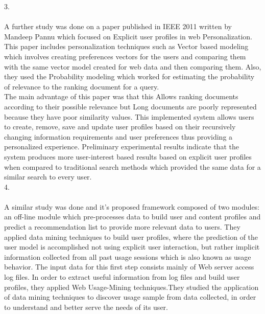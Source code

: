 3.\\ \\ A further study was done on a paper published in IEEE 2011
written by Mandeep Pannu which focused on Explicit user
profiles in web Personalization. This paper includes
personalization techniques such as Vector based modeling
which involves creating preferences vectors for the users and
comparing them with the same vector model created for web
data and then comparing them. Also, they used the Probability
modeling which worked for estimating the probability of
relevance to the ranking document for a query.\\ The main
advantage of this paper was that this Allows ranking
documents according to their possible relevance but Long
documents are poorly represented because they have poor
similarity values. This implemented system allows users to
create, remove, save and update user profiles based on their
recursively changing information requirements and user preferences thus providing a
personalized experience. Preliminary experimental results
indicate that the system produces more user-interest based
results based on explicit user profiles when compared to
traditional search methods which provided the same data for a
similar search to every user.\\

4.\\ \\ A similar study was done and it’s proposed framework
composed of two modules: an off-line module which
pre-processes data to build user and content profiles and predict a recommendation list to
provide more relevant data to users. They applied data mining
techniques to build user profiles, where the prediction of the
user model is accomplished not using explicit user interaction,
but rather implicit information collected from all past usage
sessions which is also known as usage behavior. The input
data for this first step consists mainly of Web server access log
files. In order to extract useful information from log files and
build user profiles, they applied Web Usage-Mining
techniques.They studied the application of data mining techniques to
discover usage sample from data collected, in order to understand
and better serve the needs of its user.\\

